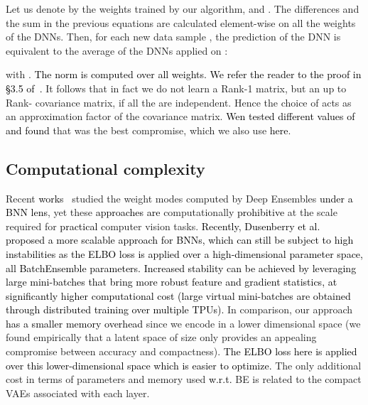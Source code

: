 \documentclass[10pt,twocolumn,letterpaper]{article}
\newcommand{\ab}[1]{\textcolor{black}{#1}}
\begin{document}
Let us denote by  the  weights trained by our algorithm,    and . The differences and the sum in the previous equations are calculated element-wise on all the weights of the DNNs. 
Then, for each new data sample {}, the prediction of the DNN   is equivalent to the average of the DNNs   applied on   :

with .
\ab{The  norm is computed over all weights.}
\ab{We refer the reader to the proof in \S3.5 of~\cite{izmailov2018averaging}.}
It follows that in fact we do not learn a Rank-1 matrix, but an up to Rank- covariance matrix, if all the   are independent. 
Hence the choice of  acts as an approximation factor of the covariance matrix. 
\ab{Wen \etal\cite{wen2020batchensemble} tested 
different values of  and found} that  was the best compromise, which we also use \ab{here}.


 
\subsection{Computational complexity}
\label{subsection3appendix}

Recent 
\ab{works}~\cite{fort2019deep,wilson2020bayesian} 
studied the weight modes 
computed by Deep Ensembles \ab{under a BNN lens}, yet these \ab{approaches are} computationally \ab{prohibitive} at the scale required for \ab{practical} computer vision tasks. \ab{Recently, Dusenberry et al.~\cite{dusenberry2020efficient} proposed a more scalable approach for BNNs, which can still be subject to high instabilities as the ELBO loss is applied over a high-dimensional parameter space, all BatchEnsemble parameters. Increased stability can be achieved by leveraging large mini-batches that bring more robust feature and gradient statistics, at significantly higher computational cost (large virtual mini-batches are obtained through distributed training over multiple TPUs).}
In comparison, our 
approach 
\ab{has a smaller memory overhead} since we encode  in a lower dimensional space (we found empirically that a latent space of size {only}  provides {an appealing} compromise between accuracy and compactness). \ab{The ELBO loss here is applied over this lower-dimensional space which is easier to optimize.} The only additional cost in terms of parameters and memory used 
\ab{w.r.t.} BE is related to the compact VAEs associated with each layer. 
\end{document}

